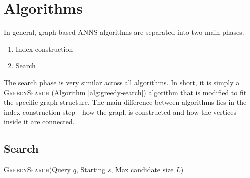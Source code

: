 \chapter{Algorithms}

In general, graph-based ANNS algorithms are separated into two main phases.
\begin{enumerate}
    \item Index construction
    \item Search 
\end{enumerate}
The search phase is very similar across all algorithms. In short, it is simply a \textsc{GreedySearch} (Algorithm \ref{alg:greedy-search}) algorithm that is modified to fit the specific graph structure. The main difference between algorithms lies in the index construction step---how the graph is constructed and how the vertices inside it are connected.

\section{Search}

\begin{algorithm}[H]
    \caption{\textsc{GreedySearch}(Query \(q\), Starting \(s\), Max candidate size \(L\))}\label{alg:greedy-search}
    \begin{algorithmic}[1]
         
            \EndIf
        \EndWhile
    \end{algorithmic}
\end{algorithm}

